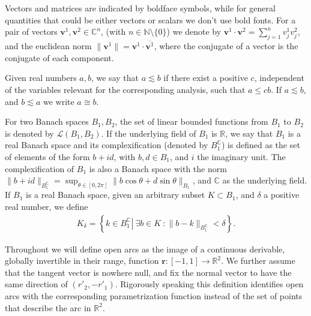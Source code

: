 \documentclass{article}
\newcommand{\IC}{{\mathbb C}}
\newcommand{\IN}{{\mathbb N}}
\newcommand{\IR}{{\mathbb R}}
\newcommand{\bv}{\bm{v}}
\newcommand{\br}{\bm{r}}
\begin{document}
Vectors and matrices are indicated by boldface symbols, while for general quantities that could be either vectors or scalars we don't use bold fonts. For a pair of vectors $\bv^1,\bv^2 \in \IC^n$, (with $n \in \IN\setminus \{0\}$) we denote by $ \bv^1 \cdot \bv^2 = \sum_{j=1}^n v^1_j v^2_j$, and the euclidean norm $\|\bv^1\| = \bv^1 \cdot \overline{\bv^1}$, where the conjugate of a vector is the conjugate of each component.

Given real numbers $a,b$, we say that $a \lesssim b $ if there exist a positive $c$, independent of the variables relevant for the corresponding analysis, such that $a \leq c b$. If $a \lesssim b$, and $b \lesssim a$ we write $a \cong b$.

For two Banach spaces $B_1,B_2$, the set of linear bounded functions from $B_1$ to $B_2$ is denoted by $\mathcal{L}(B_1,B_2)$. If the underlying field of $B_1$ is $\IR$, we say that $B_1$ is a real Banach space and its complexification (denoted by $B_1^{\IC}$) is defined as the set of elements of the form $b+id$, with $b,d \in B_1$, and $i$ the imaginary unit. The complexification of $B_1$ is also a Banach space with the norm $\|b+id\|_{B_1^{\IC}} = \sup_{\theta \in [0,2\pi]}\| b \cos \theta + d \sin \theta\|_{B_1}$, and $\IC$ as the underlying field. If $B_1$ is a real Banach space, given an arbitrary subset $K \subset B_1$, and $\delta$ a positive real number, we define 
\begin{align}
\label{eq:deltasets}
K_\delta = \left\lbrace  \left. k \in B_1^{\IC} \right\vert \   \exists b \in K\ : \|b-k\|_{B_1^{\IC}} < \delta \right\rbrace.
\end{align}

Throughout we will define open arcs as the image of a continuous derivable, globally invertible in their range, function $\br : [-1,1] \rightarrow \IR^2$.  We further assume that the tangent vector is nowhere null, and fix the normal vector to have the same direction of $(r'_2,-r'_1)$. Rigorously speaking  this definition identifies open arcs with the corresponding parametrization function instead of the set of points that describe the arc in $\IR^2$. 
\end{document}
